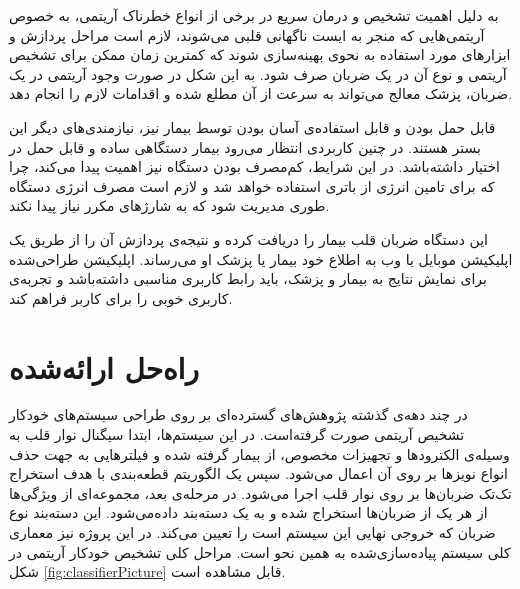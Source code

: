 به دلیل اهمیت تشخیص و درمان سریع در برخی از انواع خطرناک آریتمی، به خصوص آریتمی‌هایی که منجر به ایست ناگهانی قلبی می‌شوند، لازم است مراحل پردازش و ابزارهای مورد استفاده به نحوی بهینه‌سازی شوند که کمترین زمان ممکن برای تشخیص آریتمی و نوع آن در یک ضربان صرف شود. به این شکل در صورت وجود آریتمی در یک ضربان، پزشک معالج می‌تواند به سرعت از آن مطلع شده و اقدامات لازم را انجام دهد.

قابل حمل بودن و قابل استفاده‌ی آسان بودن توسط بیمار نیز، نیازمندی‌های دیگر این بستر هستند. در چنین کاربردی انتظار می‌رود بیمار دستگاهی ساده و قابل حمل در اختیار داشته‌باشد. در این شرایط،  کم‌مصرف بودن دستگاه نیز اهمیت پیدا می‌کند، چرا که برای تامین انرژی از باتری استفاده خواهد شد و لازم است مصرف انرژی دستگاه طوری مدیریت شود که به شارژهای مکرر نیاز پیدا نکند.

 این دستگاه ضربان قلب بیمار را دریافت کرده و نتیجه‌ی پردازش آن را از طریق یک اپلیکیشن موبایل یا وب به اطلاع خود بیمار یا پزشک او می‌رساند.  اپلیکیشن طراحی‌شده برای نمایش نتایج به بیمار و پزشک، باید رابط کاربری مناسبی داشته‌باشد و تجربه‌ی کاربری خوبی را برای کاربر فراهم کند. 
 


\section{راه‌حل ارائه‌شده}

در چند دهه‌ی گذشته پژوهش‌های گسترده‌ای بر روی طراحی سیستم‌های خودکار تشخیص آریتمی صورت گرفته‌است. در این سیستم‌ها، ابتدا سیگنال نوار قلب به وسیله‌ی الکترودها و تجهیزات مخصوص، از بیمار گرفته شده و فیلترهایی به جهت حذف انواع نویزها بر روی آن اعمال می‌شود. سپس یک الگوریتم قطعه‌بندی   با هدف استخراج تک‌تک ضربان‌ها بر روی نوار قلب اجرا می‌شود. در مرحله‌ی بعد، مجموعه‌ای از ویژگی‌ها از هر یک از ضربان‌ها استخراج شده و به یک دسته‌بند  داده‌می‌شود. این دسته‌بند نوع ضربان که خروجی نهایی این سیستم است را تعیین می‌کند. در این پروژه نیز معماری کلی سیستم پیاد‌ه‌سازی‌شده به همین نحو است. مراحل کلی تشخیص خودکار آریتمی در شکل \ref{fig:classifierPicture} قابل مشاهده است.
 
